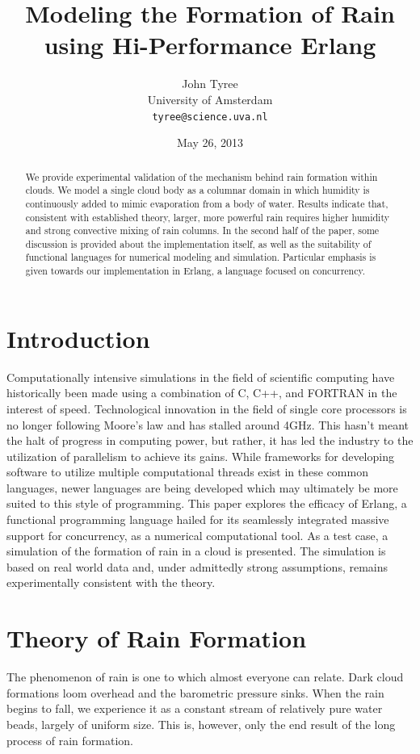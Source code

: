 \documentclass[twocolumn,a4paper,10pt]{article}
\title{Modeling the Formation of Rain using Hi-Performance Erlang}
\author{John Tyree\\
University of Amsterdam\\
\texttt{tyree@science.uva.nl}}
\date{May 26, 2013}
\begin{document}
\maketitle
\begin{abstract}
    We provide experimental validation of the mechanism behind rain formation
    within clouds. We model a single cloud body as a columnar domain in which
    humidity is continuously added to mimic evaporation from a body of water.
    Results indicate that, consistent with established theory, larger, more
    powerful rain requires higher humidity and strong convective mixing of rain
    columns.  In the second half of the paper, some discussion is provided about
    the implementation itself, as well as the suitability of functional
    languages for numerical modeling and simulation. Particular emphasis is
    given towards our implementation in Erlang, a language focused on
    concurrency.
\end{abstract}
\section{Introduction}

Computationally intensive simulations in the field of scientific computing have
historically been made using a combination of C, C++, and FORTRAN in the
interest of speed. Technological innovation in the field of single core
processors is no longer following Moore's law and has stalled around 4GHz. This
hasn't meant the halt of progress in computing power, but rather, it has led the
industry to the utilization of parallelism to achieve its gains. While
frameworks for developing software to utilize multiple computational threads
exist in these common languages, newer languages are being developed which may
ultimately be more suited to this style of programming. This paper explores the
efficacy of Erlang, a functional programming language hailed for its seamlessly
integrated massive support for concurrency, as a numerical computational tool.
As a test case, a simulation of the formation of rain in a cloud is presented.
The simulation is based on real world data and, under admittedly strong
assumptions, remains experimentally consistent with the theory.

\section{Theory of Rain Formation}

The phenomenon of rain is one to which almost everyone can relate. Dark cloud
formations loom overhead and the barometric pressure sinks. When the rain begins
to fall, we experience it as a constant stream of relatively pure water beads,
largely of uniform size. This is, however, only the end result of the long process of
rain formation.
\end{document}
